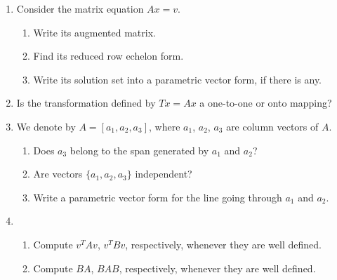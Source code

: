 \documentclass[11pt]{amsart}
\begin{document}
\begin{enumerate}
\item  Consider the matrix equation $Ax = v$. 
\begin{enumerate}
\item Write its augmented matrix.
\vspace{.5in}
\item Find its reduced row echelon form.
\vspace{.5in}
\vspace{.5in}
\vspace{.5in}
\item  Write its solution set into a parametric vector form, if there is any.
\vspace{.5in}
\vspace{.5in}
\vspace{.5in}
\end{enumerate}
\item  %
Is the transformation defined by $Tx = Ax$
a one-to-one or onto mapping?
\vspace{.5in}
\vspace{.5in}

\newpage
\item We denote by $A = [a_1, a_2, a_3]$, where $a_1$, $a_2$, $a_3$ are column vectors of $A$.
\begin{enumerate}
\item  Does  $a_3$ belong to the span generated by $a_1$ and $a_2$?
\vspace{.5in}
  \item
  \vspace{.5in}
Are vectors $\{a_1, a_2, a_3\}$ independent?
\vspace{.5in}
\vspace{.5in}

\item
 Write a parametric vector form for the line going through $a_1$ and $a_2$.
 \vspace{.5in}
 \vspace{.5in}
 \vspace{.5in}
\end{enumerate}



\item
\begin{enumerate}
\item Compute $v^TAv$, $v^TBv$, respectively, whenever they are well defined.
\vspace{.5in}
\vspace{.5in}
\vspace{.3in}
\item
Compute $BA$, $BAB$, respectively, whenever they are well defined.
\vspace{.5in}
\vspace{.5in}
\vspace{.3in}


\end{enumerate}
\end{enumerate}
\end{document}
